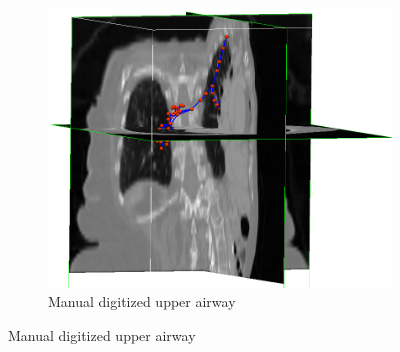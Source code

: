 \begin{figure}[htbp] 
\centering
\begin{subfigure}{.53\linewidth}%
  \includegraphics[width=\linewidth,trim={{.0\wd0} {.0\wd0} {.0\wd0} {.0\wd0}},clip]{ModelBasedAnalysis/Image/IPF511_UpperAirwayDigitizing3.png}
  \caption{Manual digitized upper airway}
  \label{fig:AirwayGeneration-a} 
\end{subfigure}

\end{figure}
